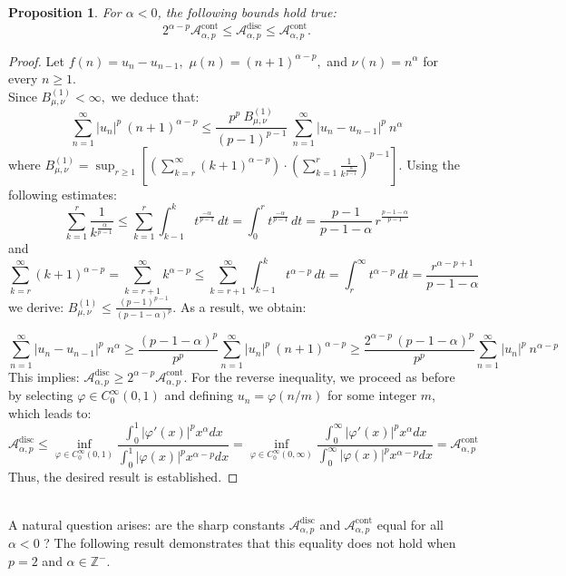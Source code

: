 \documentclass[11pt]{amsart}
\newtheorem{prop}[thm]{Proposition}
\newcommand{\1}{[1]}
\def\phi{\varphi}
\begin{document}
\begin{prop} \label{prop 4.8} For $\alpha < 0$, the following bounds hold true: 
$$
2^{\alpha-p} \mathcal{A}_{\alpha,p}^{\text{cont}} \leq \mathcal{A}_{\alpha,p}^{\text{disc}} \leq \mathcal{A}_{\alpha,p}^{\text{cont}}.
$$
\end{prop} 
\begin{proof}
Let $ f(n)= u_{n}-u_{n-1},$  $\mu(n)= (n+1)^{\alpha-p},$ and $\nu(n)= n^{\alpha}$ for every $n\geq 1.$ \\
Since $B_{\mu,\nu}^{(1)} < \infty,$  we deduce that:
$$\sum_{n=1}^{\infty} |u_{n}|^{p} \ (n+1)^{\alpha-p} \leq \frac{p^{p} \ B_{\mu,\nu}^{(1)}}{(p-1)^{p-1}}  \ \sum_{n=1}^{\infty} |u_{n}-u_{n-1}|^{p} \ n^{\alpha}$$
where $ \displaystyle B_{\mu,\nu}^{(1)} = \sup_{r \geq 1} \left[ \left( \sum_{k=r}^{\infty} (k+1)^{\alpha-p} \right) \cdot \left( \sum_{k=1}^{r} \frac{1}{k^{\frac{\alpha}{p-1}}} \right)^{p-1} \right].$ Using the following estimates:
$$\sum_{k=1}^{r} \frac{1}{k^{\frac{\alpha}{p-1}}} \leq \sum_{k=1}^{r} \int_{k-1}^{k} t^{\frac{-\alpha}{p-1}} \, dt =  \int_{0}^{r} t^{\frac{-\alpha}{p-1}} \, dt = \frac{p-1}{p-1-\alpha} \, r^{\frac{p-1-\alpha}{p-1}}
$$
and 
$$\sum_{k=r}^{\infty} (k+1)^{\alpha-p}
=\sum_{k=r+1}^{\infty} k^{\alpha-p}
\leq \sum_{k=r+1}^{\infty} \int_{k-1}^{k} t^{\alpha-p}\,dt = \int_{r}^{\infty} t^{\alpha-p}\,dt
=\frac{r^{\alpha-p+1}}{p-1-\alpha}
$$
we derive: $B_{\mu,\nu}^{(1)} \leq \frac{(p-1)^{p-1}} {(p-1-\alpha)^p}.$ As a result, we obtain:

$$ \sum_{n=1}^{\infty} |u_{n}-u_{n-1}|^{p} \ n^{\alpha} \geq  \frac {(p-1-\alpha)^p} {p^{p}} \sum_{n=1}^{\infty} |u_{n}|^{p} \ (n+1)^{\alpha-p} \geq \frac { 2^{\alpha-p} \, (p-1-\alpha)^p} {p^{p}} \sum_{n=1}^{\infty} |u_{n}|^{p} \ n^{\alpha-p} $$
This implies: $\mathcal{A}_{\alpha,p}^{\text{disc}} \geq 2^{\alpha-p} \mathcal{A}_{\alpha,p}^{\text{cont}}$. For the reverse inequality, we proceed as before by selecting $ \phi \in C_{0}^{\infty}(0,1)$ and defining $u_{n} = \phi(n/m)$ for some integer $m$, which leads to:
$$\mathcal{A}_{\alpha,p}^{\text{disc}} \leq  \inf_{\phi \in C^{\infty}_{0} (0,1)} \frac{\displaystyle \int_{0}^{1} |\phi'(x)|^p x^{\alpha} dx}{\displaystyle \int_{0}^{1} |\phi(x)|^p x^{\alpha-p} dx} = 
  \inf_{\phi \in C^{\infty}_{0} (0,\infty)} \frac{\displaystyle \int_{0}^{\infty} |\phi'(x)|^p x^{\alpha} dx}{\displaystyle \int_{0}^{\infty} |\phi(x)|^p  x^{\alpha-p} dx} = \mathcal{A}^{\text{cont}}_{\alpha,p} $$ 
Thus, the desired result is established.
\end{proof}
\phantom{.} \\
A natural question arises: are the sharp constants $\mathcal{A}_{\alpha,p}^{\text{disc}}$ and $\mathcal{A}_{\alpha,p}^{\text{cont}}$ equal for all $\alpha < 0$ ? The following result demonstrates that this equality does not hold when $p = 2$ and $\alpha \in \mathbb{Z}^{-}$.
\end{document}
